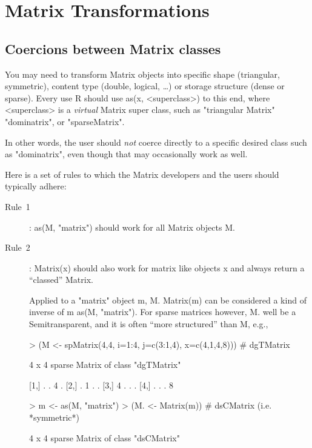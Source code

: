 \documentclass{article}
\begin{document}
{\section{Matrix Transformations}
\label{sec:trafos}

\subsection{Coercions between Matrix classes}
\label{ssec:coerce}

You may need to transform Matrix objects into specific shape (triangular,
symmetric), content type (double, logical, \dots) or storage structure
(dense or sparse).
Every use R should use as(x, <superclass>) to this end, where
<superclass> is a \emph{virtual} Matrix super class, such as
"triangular Matrix" "dominatrix", or "sparseMatrix".

In other words, the user should \emph{not} coerce directly to a specific
desired class such as "dominatrix", even though that may
occasionally work as well.

Here is a set of rules to which the Matrix developers and the users
should typically adhere:
\begin{description}

\item[Rule~1]:  as(M, "matrix") should work for all Matrix
  objects M.

\item[Rule~2]:  Matrix(x) should also work for matrix like
objects x and always return a ``classed'' Matrix.

Applied to a "matrix" object m, M. Matrix(m) can be
considered a kind of inverse of m as(M, "matrix").
For sparse matrices however, M. well be a
Semitransparent, and it is often ``more structured'' than M,
e.g.,
\begin{Schunk}
\begin{Sinput}
> (M <- spMatrix(4,4, i=1:4, j=c(3:1,4), x=c(4,1,4,8))) # dgTMatrix
\end{Sinput}
\begin{Soutput}
4 x 4 sparse Matrix of class "dgTMatrix"
            
[1,] . . 4 .
[2,] . 1 . .
[3,] 4 . . .
[4,] . . . 8
\end{Soutput}
\begin{Sinput}
> m <- as(M, "matrix")
> (M. <- Matrix(m)) # dsCMatrix (i.e. *symmetric*)
\end{Sinput}
\begin{Soutput}
4 x 4 sparse Matrix of class "dsCMatrix"
            

\end{Soutput}
\end{Schunk}
\end{description}}
\end{document}
